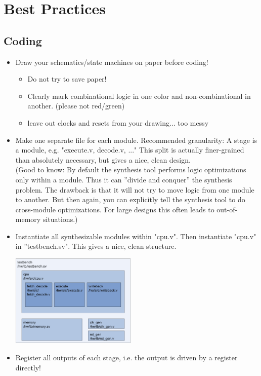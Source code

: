 \newpage

\section{Best Practices}



\subsection{Coding}
\begin{itemize}
	\item Draw your schematics/state machines on paper before coding!
	\begin{itemize}
		\item Do not try to save paper!
		\item Clearly mark combinational logic in one color and non-combinational in another. (please not red/green)
\item leave out clocks and resets from your drawing... too messy	
	\end{itemize}
	\item Make one separate file for each module. Recommended granularity: A stage is a module, e.g. "execute.v, decode.v, ..." This split is actually finer-grained than absolutely necessary, but gives a nice, clean design.\\
	(Good to know: By default the synthesis tool performs logic optimizations only within a module. Thus it can ''divide and conquer'' the synthesis problem. The drawback is that it will not try to move logic from one module to another. But then again, you can explicitly tell the synthesis tool to do cross-module optimizations. For large designs this often leads to out-of-memory situations.)
	\item Instantiate all synthesizable modules within "cpu.v". Then instantiate "cpu.v" in ''testbench.sv". This gives a nice, clean structure.
	\begin{center}
\includegraphics[width=6cm]{figs/block}
\end{center}
	\item Register all outputs of each stage, i.e. the output is driven by a register directly!

\end{itemize}
